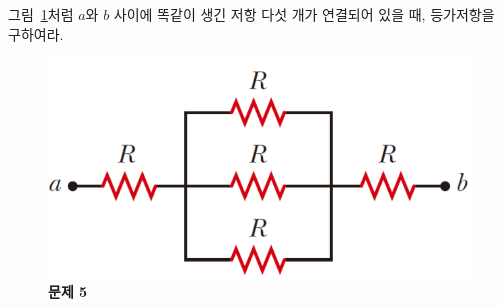 \documentclass[tightenlines,floatfix,nofootinbib,superscriptaddress,fleqn]{revtex4}
\begin{document}
그림~\ref{fig:2}처럼 $a$와 $b$ 사이에 똑같이 생긴 저항 다섯 개가
연결되어 있을 때, 등가저항을 구하여라. 
\begin{figure}[htp]
  \centering
  \includegraphics[scale=0.45]{qfig5-20220914-2.pdf}
  \caption{\textbf{문제 5}}
  \label{fig:2}
\end{figure}

\vspace{0.5cm}


\vspace{0.5cm}
\end{document}
